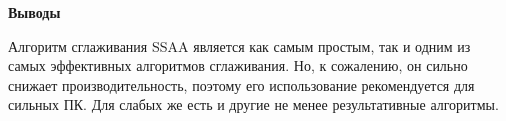 \textbf{\large Выводы}

Алгоритм сглаживания SSAA является как самым простым, так и одним из самых эффективных алгоритмов сглаживания. Но, к сожалению, он сильно снижает производительность, поэтому его использование рекомендуется для сильных ПК. Для слабых же есть и другие не менее результативные алгоритмы.